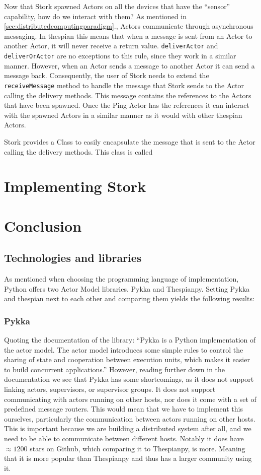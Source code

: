 \documentclass[a4paper]{article}
\newcommand{\secref}[1]{\autoref{#1}.}
\begin{document}
Now that Stork spawned Actors on all the devices that have the \enquote{sensor} capability, how do we interact with them? As mentioned in \secref{sec:distributedcomputingparadigm}, Actors communicate through asynchronous messaging. In thespian this means that when a message is sent from an Actor to another Actor, it will never receive a return value. \lstinline|deliverActor| and \lstinline|deliverOrActor| are no exceptions to this rule, since they work in a similar manner. However, when an Actor sends a message to another Actor it can send a message back. Consequently, the user of Stork needs to extend the \lstinline|receiveMessage| method to handle the message that Stork sends to the Actor calling the delivery methods. This message contains the references to the Actors that have been spawned. Once the Ping Actor has the references it can interact with the spawned Actors in a similar manner as it would with other thespian Actors.

Stork provides a Class to easily encapsulate the message that is sent to the Actor calling the delivery methods. This class is called \lstinline||


\section{Implementing Stork}
\section{Conclusion}

\subsection{Technologies and libraries}
As mentioned when choosing the programming language of implementation, Python offers two Actor Model libraries. Pykka and Thespianpy. Setting Pykka and thespian next to each other and comparing them yields the following results:
\subsubsection{Pykka}
Quoting the documentation of the library: \enquote{Pykka is a Python implementation of the actor model. The actor model introduces some simple rules to control the sharing of state and cooperation between execution units, which makes it easier to build concurrent applications.} However, reading further down in the documentation we see that Pykka has some shortcomings, as it does not support linking actors, supervisors, or supervisor groups. It does not support communicating with actors running on other hosts, nor does it come with a set of predefined message routers. This would mean that we have to implement this ourselves, particularly the communication between actors running on other hosts. This is important because we are building a distributed system after all, and we need to be able to communicate between different hosts. Notably it does have \(\approx 1200\) stars on Github, which comparing it to Thespianpy, is more. Meaning that it is more popular than Thespianpy and thus has a larger community using it.
\end{document}
